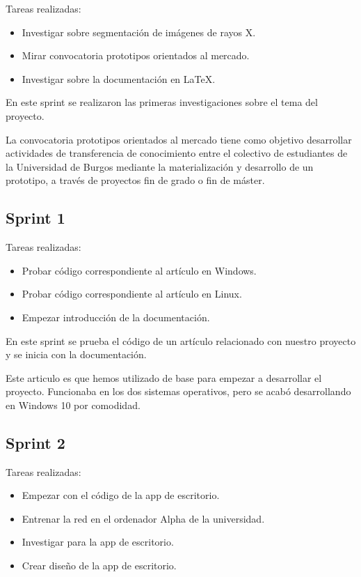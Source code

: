 Tareas realizadas:

\begin{itemize}
    \item Investigar sobre segmentación de imágenes de rayos X.
    \item Mirar convocatoria prototipos orientados al mercado.
    \item Investigar sobre la documentación en \LaTeX{}.
\end{itemize}

En este sprint se realizaron las primeras investigaciones sobre el tema del proyecto.

La convocatoria prototipos orientados al mercado tiene como objetivo desarrollar actividades de transferencia de conocimiento entre el colectivo de estudiantes de la Universidad de Burgos mediante la materialización y desarrollo de un prototipo, a través de proyectos fin de grado o fin de máster.

\subsection{Sprint 1}

Tareas realizadas:

\begin{itemize}
    \item Probar código correspondiente al artículo \cite{articulo2} en Windows.
    \item Probar código correspondiente al artículo \cite{articulo2} en Linux.
    \item Empezar introducción de la documentación.
\end{itemize}

En este sprint se prueba el código de un artículo relacionado con nuestro proyecto \cite{articulo2} y se inicia con la documentación.

Este articulo es que hemos utilizado de base para empezar a desarrollar el proyecto. Funcionaba en los dos sistemas operativos, pero se acabó desarrollando en Windows 10 por comodidad.

\subsection{Sprint 2}

Tareas realizadas:

\begin{itemize}
    \item Empezar con el código de la app de escritorio.
    \item Entrenar la red en el ordenador Alpha de la universidad.
    \item Investigar para la app de escritorio.
    \item Crear diseño de la app de escritorio.
\end{itemize}

